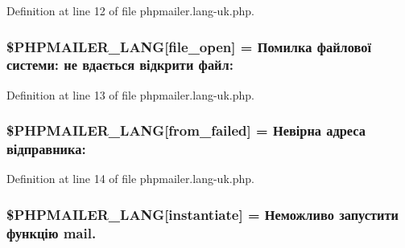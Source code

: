 Definition at line 12 of file phpmailer.\+lang-\/uk.\+php.

\subsubsection[{\texorpdfstring{\$\+P\+H\+P\+M\+A\+I\+L\+E\+R\+\_\+\+L\+A\+NG}{$PHPMAILER_LANG}}]{\setlength{\rightskip}{0pt plus 5cm}\$P\+H\+P\+M\+A\+I\+L\+E\+R\+\_\+\+L\+A\+NG\mbox{[}\textquotesingle{}file\+\_\+open\textquotesingle{}\mbox{]} = \textquotesingle{}Помилка файлової системи\+: не вдається відкрити файл\+: \textquotesingle{}}\hypertarget{phpmailer_8lang-uk_8php_a28d1a6517bf4c942a0ddd506188ad2e0}{}\label{phpmailer_8lang-uk_8php_a28d1a6517bf4c942a0ddd506188ad2e0}


Definition at line 13 of file phpmailer.\+lang-\/uk.\+php.

\subsubsection[{\texorpdfstring{\$\+P\+H\+P\+M\+A\+I\+L\+E\+R\+\_\+\+L\+A\+NG}{$PHPMAILER_LANG}}]{\setlength{\rightskip}{0pt plus 5cm}\$P\+H\+P\+M\+A\+I\+L\+E\+R\+\_\+\+L\+A\+NG\mbox{[}\textquotesingle{}from\+\_\+failed\textquotesingle{}\mbox{]} = \textquotesingle{}Невірна адреса відправника\+: \textquotesingle{}}\hypertarget{phpmailer_8lang-uk_8php_adf832ae12155a09be077c6d5e4fd7e22}{}\label{phpmailer_8lang-uk_8php_adf832ae12155a09be077c6d5e4fd7e22}


Definition at line 14 of file phpmailer.\+lang-\/uk.\+php.

\subsubsection[{\texorpdfstring{\$\+P\+H\+P\+M\+A\+I\+L\+E\+R\+\_\+\+L\+A\+NG}{$PHPMAILER_LANG}}]{\setlength{\rightskip}{0pt plus 5cm}\$P\+H\+P\+M\+A\+I\+L\+E\+R\+\_\+\+L\+A\+NG\mbox{[}\textquotesingle{}instantiate\textquotesingle{}\mbox{]} = \textquotesingle{}Неможливо запустити функцію mail.\textquotesingle{}}\hypertarget{phpmailer_8lang-uk_8php_ad58dde16780f4770ccf4dd282ea1f5ad}{}\label{phpmailer_8lang-uk_8php_ad58dde16780f4770ccf4dd282ea1f5ad}


